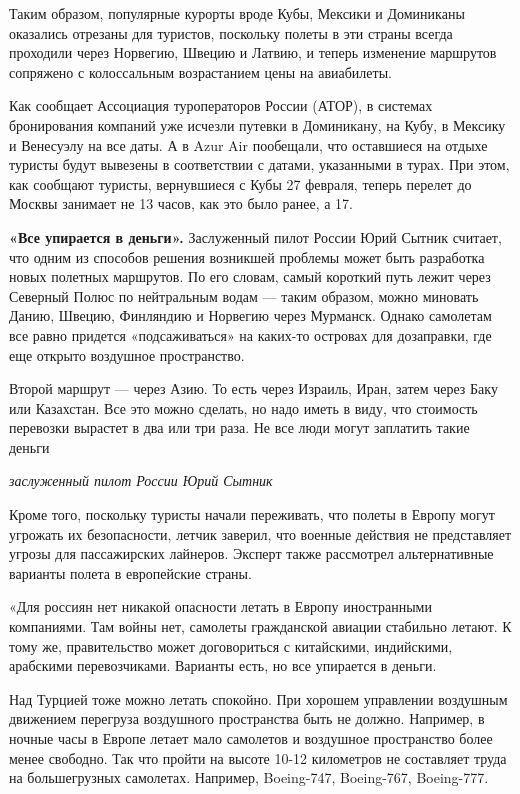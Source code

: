Таким образом, популярные курорты вроде Кубы, Мексики и Доминиканы оказались отрезаны для туристов, поскольку полеты в эти страны всегда проходили через Норвегию, Швецию и Латвию, и теперь изменение маршрутов сопряжено с колоссальным возрастанием цены на авиабилеты.

Как сообщает Ассоциация туроператоров России (АТОР), в системах бронирования компаний уже исчезли путевки в Доминикану, на Кубу, в Мексику и Венесуэлу на все даты. А в Azur Air пообещали, что оставшиеся на отдыхе туристы будут вывезены в соответствии с датами, указанными в турах. При этом, как сообщают туристы, вернувшиеся с Кубы 27 февраля, теперь перелет до Москвы занимает не 13 часов, как это было ранее, а 17.

\textbf{«Все упирается в деньги».} Заслуженный пилот России Юрий Сытник считает, что одним из способов решения возникшей проблемы может быть разработка новых полетных маршрутов. По его словам, самый короткий путь лежит через Северный Полюс по нейтральным водам --- таким образом, можно миновать Данию, Швецию, Финляндию и Норвегию через Мурманск. Однако самолетам все равно придется «подсаживаться» на каких-то островах для дозаправки, где еще открыто воздушное пространство.

\begin{fancyquotes}
    Второй маршрут --- через Азию. То есть через Израиль, Иран, затем через Баку или Казахстан. Все это можно сделать, но надо иметь в виду, что стоимость перевозки вырастет в два или три раза. Не все люди могут заплатить такие деньги

    \hfill\textit{заслуженный пилот России Юрий Сытник}
\end{fancyquotes}

Кроме того, поскольку туристы начали переживать, что полеты в Европу могут угрожать их безопасности, летчик заверил, что военные действия не представляет угрозы для пассажирских лайнеров. Эксперт также рассмотрел альтернативные варианты полета в европейские страны.

«Для россиян нет никакой опасности летать в Европу иностранными компаниями. Там войны нет, самолеты гражданской авиации стабильно летают. К тому же, правительство может договориться с китайскими, индийскими, арабскими перевозчиками. Варианты есть, но все упирается в деньги.

Над Турцией тоже можно летать спокойно. При хорошем управлении воздушным движением перегруза воздушного пространства быть не должно. Например, в ночные часы в Европе летает мало самолетов и воздушное пространство более менее свободно. Так что пройти на высоте 10-12 километров не составляет труда на большегрузных самолетах. Например, Boeing-747, Boeing-767, Boeing-777.


